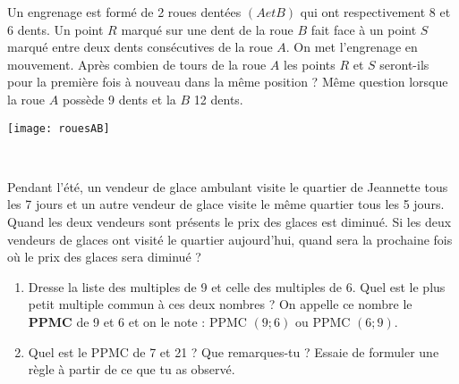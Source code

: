 
\begin{activite}

\begin{partie}
 \begin{minipage}[c]{0.6\textwidth}
Un engrenage est formé de 2 roues dentées $(A et B)$ qui ont respectivement 8 et 6 dents. Un point $R$ marqué sur une dent de la roue $B$ fait face à un point $S$ marqué entre deux dents consécutives de la roue $A$. On met l'engrenage en mouvement. Après combien de tours de la roue $A$ les points $R$ et $S$ seront-ils pour la première fois à nouveau dans la même position ? Même question lorsque la roue $A$ possède 9 dents et la $B$ 12 dents.
 \end{minipage} \hfill%
 \begin{minipage}[c]{0.2\textwidth}
  \texttt{[image: rouesAB]}
  \end{minipage} \\
\end{partie}

\begin{partie}
Pendant l'été, un vendeur de glace ambulant visite le quartier de Jeannette tous les 7 jours et un autre vendeur de glace visite le même quartier tous les 5 jours. Quand les deux vendeurs sont présents le prix des glaces est diminué. Si les deux vendeurs de glaces ont visité le quartier aujourd'hui, quand sera la prochaine fois où le prix des glaces sera diminué ?
\end{partie}

\begin{partie}[PPMC]
\begin{enumerate}
 \item Dresse la liste des multiples de 9 et celle des multiples de 6. Quel est le plus petit multiple commun à ces deux nombres ? On appelle ce nombre le \textbf{PPMC} de 9 et 6 et on le note : PPMC $(9 ; 6)$ ou PPMC $(6 ; 9)$.
 \item Quel est le PPMC de 7 et 21 ? Que remarques-tu ? Essaie de formuler une règle à partir de ce que tu as observé.
 \end{enumerate}
\end{partie}

\end{activite}


